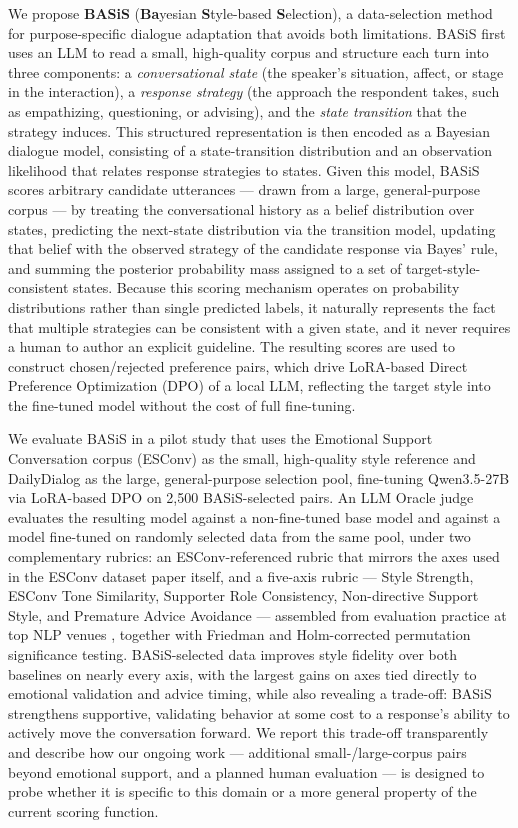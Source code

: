 \documentclass[manuscript,review,anonymous]{acmart}
\begin{document}
We propose \textbf{BASiS} (\textbf{Ba}yesian \textbf{S}tyle-based \textbf{S}election), a data-selection method for purpose-specific dialogue adaptation that avoids both limitations. BASiS first uses an LLM to read a small, high-quality corpus and structure each turn into three components: a \emph{conversational state} (the speaker's situation, affect, or stage in the interaction), a \emph{response strategy} (the approach the respondent takes, such as empathizing, questioning, or advising), and the \emph{state transition} that the strategy induces. This structured representation is then encoded as a Bayesian dialogue model, consisting of a state-transition distribution and an observation likelihood that relates response strategies to states. Given this model, BASiS scores arbitrary candidate utterances --- drawn from a large, general-purpose corpus --- by treating the conversational history as a belief distribution over states, predicting the next-state distribution via the transition model, updating that belief with the observed strategy of the candidate response via Bayes' rule, and summing the posterior probability mass assigned to a set of target-style-consistent states. Because this scoring mechanism operates on probability distributions rather than single predicted labels, it naturally represents the fact that multiple strategies can be consistent with a given state, and it never requires a human to author an explicit guideline. The resulting scores are used to construct chosen/rejected preference pairs, which drive LoRA-based Direct Preference Optimization (DPO) of a local LLM, reflecting the target style into the fine-tuned model without the cost of full fine-tuning.

We evaluate BASiS in a pilot study that uses the Emotional Support Conversation corpus (ESConv) \cite{liu2021esconv} as the small, high-quality style reference and DailyDialog \cite{li2017dailydialog} as the large, general-purpose selection pool, fine-tuning Qwen3.5-27B via LoRA-based DPO on 2{,}500 BASiS-selected pairs. An LLM Oracle judge evaluates the resulting model against a non-fine-tuned base model and against a model fine-tuned on randomly selected data from the same pool, under two complementary rubrics: an ESConv-referenced rubric that mirrors the axes used in the ESConv dataset paper itself, and a five-axis rubric --- Style Strength, ESConv Tone Similarity, Supporter Role Consistency, Non-directive Support Style, and Premature Advice Avoidance --- assembled from evaluation practice at top NLP venues \cite{mir2019styletransfer,liu2021esconv,zhang2018persona,deng2023mixedinitiative}, together with Friedman and Holm-corrected permutation significance testing. BASiS-selected data improves style fidelity over both baselines on nearly every axis, with the largest gains on axes tied directly to emotional validation and advice timing, while also revealing a trade-off: BASiS strengthens supportive, validating behavior at some cost to a response's ability to actively move the conversation forward. We report this trade-off transparently and describe how our ongoing work --- additional small-/large-corpus pairs beyond emotional support, and a planned human evaluation --- is designed to probe whether it is specific to this domain or a more general property of the current scoring function.
\end{document}
